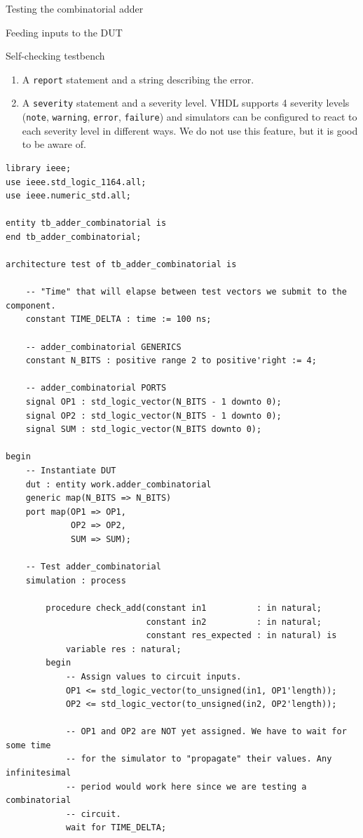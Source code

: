 \documentclass[lab]{course}
\begin{document}
\begin{section}{Testing the combinatorial adder}
\begin{subsection}{Feeding inputs to the DUT}
\begin{subsubsection}{Self-checking testbench}
            \begin{enumerate}
                \item A \verb+report+ statement and a string describing the error.
                \item A \verb+severity+ statement and a severity level. VHDL supports 4 severity levels (\verb+note+, \verb+warning+, \verb+error+, \verb+failure+) and simulators can be configured to react to each severity level in different ways. We do not use this feature, but it is good to be aware of.
            \end{enumerate}

            \begin{lstlisting}[caption={Self-checking testbench: updated \texttt{check\_add} procedure to automatically compare DUT output against expected output provided in test vector}, captionpos=b, label={lst:combinatorial_self_checking_testbench}]
library ieee;
use ieee.std_logic_1164.all;
use ieee.numeric_std.all;

entity tb_adder_combinatorial is
end tb_adder_combinatorial;

architecture test of tb_adder_combinatorial is

    -- "Time" that will elapse between test vectors we submit to the component.
    constant TIME_DELTA : time := 100 ns;

    -- adder_combinatorial GENERICS
    constant N_BITS : positive range 2 to positive'right := 4;

    -- adder_combinatorial PORTS
    signal OP1 : std_logic_vector(N_BITS - 1 downto 0);
    signal OP2 : std_logic_vector(N_BITS - 1 downto 0);
    signal SUM : std_logic_vector(N_BITS downto 0);

begin
    -- Instantiate DUT
    dut : entity work.adder_combinatorial
    generic map(N_BITS => N_BITS)
    port map(OP1 => OP1,
             OP2 => OP2,
             SUM => SUM);

    -- Test adder_combinatorial
    simulation : process

        procedure check_add(constant in1          : in natural;
                            constant in2          : in natural;
                            constant res_expected : in natural) is
            variable res : natural;
        begin
            -- Assign values to circuit inputs.
            OP1 <= std_logic_vector(to_unsigned(in1, OP1'length));
            OP2 <= std_logic_vector(to_unsigned(in2, OP2'length));

            -- OP1 and OP2 are NOT yet assigned. We have to wait for some time
            -- for the simulator to "propagate" their values. Any infinitesimal
            -- period would work here since we are testing a combinatorial
            -- circuit.
            wait for TIME_DELTA;


\end{lstlisting}
\end{subsubsection}
\end{subsection}
\end{section}
\end{document}
